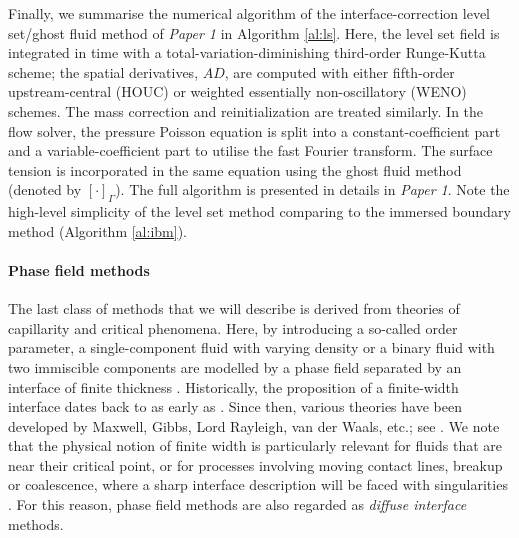 Finally, we summarise the numerical algorithm of the interface-correction level set/ghost fluid method of \emph{Paper 1} in Algorithm \ref{al:ls}.
Here, the level set field is integrated in time with a total-variation-diminishing third-order Runge-Kutta scheme; the spatial derivatives, ${AD}$, are computed with either fifth-order upstream-central (HOUC) or weighted essentially non-oscillatory (WENO) schemes. The mass correction and reinitialization are treated similarly.
In the flow solver, the pressure Poisson equation is split into a constant-coefficient part and a variable-coefficient part to utilise the fast Fourier transform.
The surface tension is incorporated in the same equation using the ghost fluid method (denoted by $[\cdot]_\Gamma$).
The full algorithm is presented in details in \emph{Paper 1}. Note the high-level simplicity of the level set method comparing to the immersed boundary method (Algorithm \ref{al:ibm}).


\medskip
\paragraph{\bf Phase field methods}

The last class of methods that we will describe is derived from theories of capillarity and critical phenomena.
Here, by introducing a so-called order parameter, a single-component fluid with varying density or a binary fluid with two immiscible components are modelled by a phase field separated by an interface of finite thickness \citep{Anderson_McFadden_Wheeler}.
Historically, the proposition of a finite-width interface dates back to as early as \cite{Poisson1831}. Since then, various theories have been developed by Maxwell, Gibbs, Lord Rayleigh, van der Waals, etc.; see \eg \cite{van-der-waals1893, Cahn1961}.
We note that the physical notion of finite width is particularly relevant for fluids that are near their critical point, or for processes involving moving contact lines, breakup or coalescence, where a sharp interface description will be faced with singularities \citep{Zhang_Mohseni_2018, Eggers1997}.
For this reason, phase field methods are also regarded as \emph{diffuse interface} methods.

